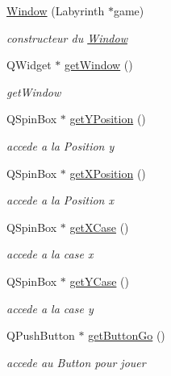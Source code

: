 \begin{DoxyCompactItemize}
\item 
\mbox{\hyperlink{class_window_a2bbdf5c5bf31fa440a4f6a11e6916093}{Window}} (Labyrinth $\ast$game)
\begin{DoxyCompactList}\small\item\em constructeur du \mbox{\hyperlink{class_window}{Window}} \end{DoxyCompactList}\item 
Q\+Widget $\ast$ \mbox{\hyperlink{class_window_a1a60012c708f7e312c7c084ff923681c}{get\+Window}} ()
\begin{DoxyCompactList}\small\item\em get\+Window \end{DoxyCompactList}\item 
Q\+Spin\+Box $\ast$ \mbox{\hyperlink{class_window_acc5670401d2edec488b8eba20cfb1d2b}{get\+Y\+Position}} ()
\begin{DoxyCompactList}\small\item\em accede a la Position y \end{DoxyCompactList}\item 
Q\+Spin\+Box $\ast$ \mbox{\hyperlink{class_window_a4748fb7d7a0de845106effeec06a30a5}{get\+X\+Position}} ()
\begin{DoxyCompactList}\small\item\em accede a la Position x \end{DoxyCompactList}\item 
Q\+Spin\+Box $\ast$ \mbox{\hyperlink{class_window_ad4653c5a933dad023b65a13e41542f7b}{get\+X\+Case}} ()
\begin{DoxyCompactList}\small\item\em accede a la case x \end{DoxyCompactList}\item 
Q\+Spin\+Box $\ast$ \mbox{\hyperlink{class_window_a4ce8d19246d36b345acb0b25a4693572}{get\+Y\+Case}} ()
\begin{DoxyCompactList}\small\item\em accede a la case y \end{DoxyCompactList}\item 
Q\+Push\+Button $\ast$ \mbox{\hyperlink{class_window_a1ae19e5cb4129fcf241af162e00ccb99}{get\+Button\+Go}} ()
\begin{DoxyCompactList}\small\item\em accede au Button pour jouer \end{DoxyCompactList}\item 

\end{DoxyCompactItemize}
